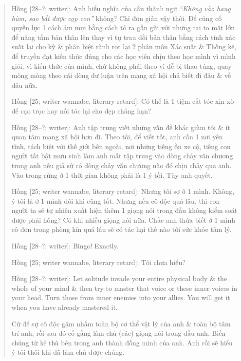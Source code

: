 \documentclass[12pt]{article}
\begin{document}
\begin{quote}
	{\sf Hồng [28--?; writer]}: Anh hiểu nghĩa của câu thành ngữ {\it ``Không vào hang hùm, sao bắt được cọp con''} không? Chỉ đơn giản vậy thôi. Để củng cố quyền lực 1 cách ám mụi bằng cách tỏ ra gần gũi với những tai to mặt lớn để nâng tầm bản thân lên thay vì tự trau dồi bản thân bằng cách tính xác suất lại cho kỹ \& phân biệt rành rọt lại 2 phân môn Xác suất \& Thống kê, để truyền đạt kiến thức đúng cho các học viên chịu theo học mình vì mình giỏi, vì kiến thức của mình, chứ không phải theo vì dễ bị thao túng, quay mòng mòng theo cái dòng dư luận trên mạng xã hội chả biết đi đâu \& về đâu nữa.
	
	{\sf Hồng [25; writer wannabe, literary retard]}: Có thể là 1 tiệm cắt tóc xịn xò để cạo trọc hay nối tóc lại cho đẹp chẳng hạn?
	
	{\sf Hồng [28--?; writer]}: Anh tập trung viết những vấn đề khác giùm tôi \& ít quan tâm mạng xã hội hơn đi. Theo tôi, để viết tốt, anh cần 1 nơi yên tĩnh, tách biệt với thế giới bên ngoài, nơi những tiếng ồn xe cộ, tiếng con người tất bật mưu sinh làm anh mất tập trung vào dòng chảy văn chương trong anh nếu giả sử có dòng chảy văn chương nào đó chịu chảy qua anh. Vào trong rừng ở 1 thời gian không phải là 1 ý tồi. Tùy anh quyết.
	
	{\sf Hồng [25; writer wannabe, literary retard]}: Nhưng tôi sợ ở 1 mình. Không, ý tôi là ở 1 mình đôi khi cũng tốt. Nhưng nếu cô độc quá lâu, thì con người ta sẽ tự nhiên xuất hiện thêm 1 giọng nói trong đầu không kiểm soát được phải hông? Có khi nhiều giọng nói nữa. Chắc anh thừa biết ở 1 mình cô đơn trong phòng kín quá lâu sẽ có tác hại thế nào tới sức khỏe tâm lý.
	
	{\sf Hồng [28--?; writer]}: Bingo! Exactly.
	
	{\sf Hồng [25; writer wannabe, literary retard]}: Tôi chưa hiểu?
	
	{\sf Hồng [28--?; writer]}: Let solitude invade your entire physical body \& the whole of your mind \& then try to master that voice or these inner voices in your head. Turn those from inner enemies into your allies. You will get it when you have already mastered it.
	
	Cứ để sự cô độc gặm nhắm toàn bộ cơ thể vật lý của anh \& toàn bộ tâm trí anh, rồi sau đó cố gắng làm chủ (các) giọng nói trong đầu anh. Biến chúng từ kẻ thù bên trong anh thành đồng minh của anh. Anh rồi sẽ hiểu ý tôi thôi khi đã làm chủ được chúng.
\end{quote}
\end{document}
